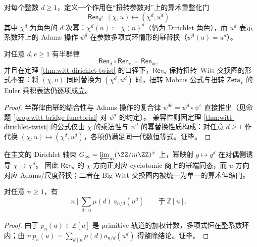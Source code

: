 \begin{definition}\label{def:witt-adams-dirichlet-renorm-gate}
对每个整数 \(d\ge 1\)，定义一个作用在“扭转参数对”上的算术重整化门
\begin{equation}\label{eq:witt-adams-dirichlet-renorm-gate}
\boxed{\;
\mathsf{Ren}_d:\ (\chi,u)\longmapsto(\chi^d,u^d)\;}
\end{equation}
其中 \(\chi^d\) 为角色的 \(d\) 次幂：\(\chi^d(n):=\chi(n)^d\)（仍为 Dirichlet 角色），而 \(u^d\) 表示系数环上的 Adams 操作 \(\psi^d\) 在参数多项式环情形的幂替换（\(\psi^d(u)=u^d\)）。
\end{definition}

\begin{proposition}\label{prop:witt-renorm-monoid}
对任意 \(d,e\ge 1\) 有半群律
\[
\mathsf{Ren}_d\circ\mathsf{Ren}_e=\mathsf{Ren}_{de}.
\]
并且在定理 \ref{thm:witt-dirichlet-twist} 的口径下，\(\mathsf{Ren}_d\) 保持扭转--Witt 交换图的形式不变：将 \((\chi,u)\) 同时替换为 \((\chi^d,u^d)\) 时，扭转 Möbius 公式与扭转 \(\mathsf{Zeta}_\chi\) 的 Euler 乘积表达仍逐项成立。
\end{proposition}

\begin{proof}
半群律由幂的结合性与 Adams 操作的复合律 \(\psi^{de}=\psi^d\circ\psi^e\) 直接推出（见命题 \ref{prop:witt-bridge-functorial} 对 \(\psi^d\) 的约定）。
兼容性则因定理 \ref{thm:witt-dirichlet-twist} 的公式仅由 \(\chi\) 的乘法性与 \(\psi^d\) 的幂替换性质构成：对任意 \(d\ge 1\) 作代换 \((\chi,u)\mapsto(\chi^d,u^d)\)，各项仍满足同一代数恒等式。证毕。
\end{proof}

\begin{remark}\label{rem:witt-renorm-cyclotomic-power-shadow}
在主文的 Dirichlet 轴束 \(G_\infty=\varprojlim_m(\ZZ/m\ZZ)^\times\) 上，幂映射 \(g\mapsto g^d\) 在对偶侧诱导 \(\chi\mapsto\chi^d\)。
因此 \(\mathsf{Ren}_d\) 的 \(\chi\)-方向正对应 cyclotomic 商上的幂端同态，而 \(u\)-方向对应 Adams/尺度替换；二者在 Big-Witt 交换图内被统一为单一的算术伸缩门。
\end{remark}

\begin{proposition}\label{prop:witt-necklace-div}
对任意 $n\ge 1$，有
\[
n\ \Big|\ \sum_{d\mid n}\mu(d)\,a_{n/d}(u^d)\qquad\text{于}\ \mathbb{Z}[u].
\]
\end{proposition}
\begin{proof}
由于 $p_n(u)\in\mathbb{Z}[u]$ 是 primitive 轨道的加权计数，多项式恒在整系数环内；由 $n\,p_n(u)=\sum_{d\mid n}\mu(d)a_{n/d}(u^d)$ 得整除结论。证毕。
\end{proof}

